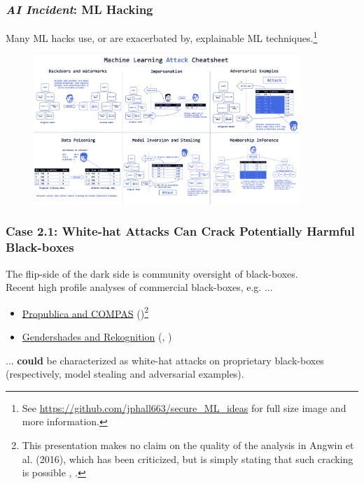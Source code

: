 \documentclass[11pt,aspectratio=169,hyperref={colorlinks}]{beamer}
\begin{document}
	\begin{frame}
	
		\frametitle{\textit{\textbf{AI Incident}}: ML Hacking}
		
\footnotesize{Many ML hacks use, or are exacerbated by, explainable ML techniques.}\footnote{\tiny{See \url{https://github.com/jphall663/secure_ML_ideas} for full size image and more information.}}
				\begin{figure}
					\begin{center}
						\includegraphics[height=160pt]{../img/cheatsheet_blue.png}
					\end{center}
				\end{figure}	
				\normalsize
	
	\end{frame}
	
	\begin{frame}
	
		\frametitle{\large{\textbf{Case 2.1}: White-hat Attacks Can Crack Potentially Harmful Black-boxes}}
		\large
		The flip-side of the dark side is community oversight of black-boxes.\\
		\vspace{10pt}
		Recent high profile analyses of commercial black-boxes, e.g. ... 
		\begin{itemize}		
			\item \href{https://www.propublica.org/article/machine-bias-risk-assessments-in-criminal-sentencing}{Propublica and COMPAS} (\citet{angwin16})\footnote{\tiny{This presentation makes no claim on the quality of the analysis in Angwin et al. (2016), which has been criticized, but is simply stating that such cracking is possible \cite{angwin16,}, \cite{flores2016false}}.}
			\item \href{https://medium.com/@Joy.Buolamwini/response-racial-and-gender-bias-in-amazon-rekognition-commercial-ai-system-for-analyzing-faces-a289222eeced}{Gendershades and Rekognition} (\citet{gender_shades}, \citet{raji2019actionable})
		\end{itemize}
		... \textbf{could} be characterized as white-hat attacks on proprietary black-boxes (respectively, model stealing and adversarial examples).

	\end{frame}
	
\end{document}
